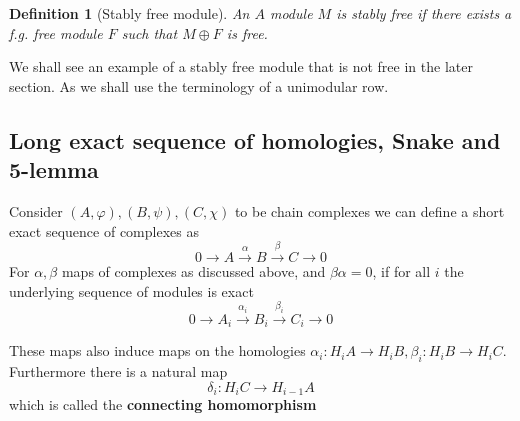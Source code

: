\documentclass[12pt]{article}
\numberwithin{equation}{section}
\newcounter{dummy} \numberwithin{dummy}{section}
\newtheorem{definition}[dummy]{Definition}
\begin{document}
	\begin{definition}[Stably free module]\label{stabfree}
		An $A$ module $M$ is stably free if there exists a f.g. free module $F$ such that $M \oplus F$ is free.
	\end{definition}
	We shall see an example of a stably free module that is not free in the later section. As we shall use the terminology of a unimodular row.
	
	
	
	\subsection{Long exact sequence of homologies, Snake and 5-lemma}
	
	Consider $(A,\varphi),(B,\psi),(C,\chi)$ to be chain complexes we can define a short exact sequence of complexes as \[ 0 \to A \xrightarrow{\alpha} B \xrightarrow{\beta} C \to 0 \]
	For $\alpha, \beta $ maps of complexes as discussed above, and $\beta \alpha=0$, if for all $i$ the underlying sequence of modules is exact\[ 0 \to A_i \xrightarrow{\alpha_i } B_i \xrightarrow{\beta_i } C_i \to 0\]
	
	These maps also induce maps on the homologies $\alpha_i: H_i A \to H_i B, \beta_i: H_i B \to H_i C$. Furthermore there is a natural map \[ 	\delta_i : H_i C \to H_{i-1}A	 \] which is called the \textbf{connecting homomorphism}
	
\end{document}
